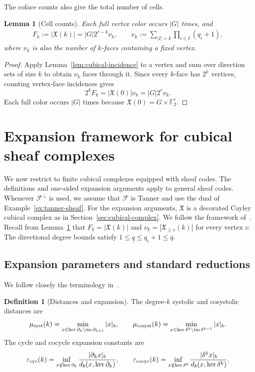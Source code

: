 \documentclass[11pt,letterpaper]{article}
\renewcommand{\le}{\leqslant}
\renewcommand{\ge}{\geqslant}
\newtheorem{lemma}[theorem]{Lemma}
\theoremstyle{definition}
\newtheorem{definition}[theorem]{Definition}
\theoremstyle{remark}
\newcommand{\F}{\mathbb F}
\newcommand{\cF}{\mathcal F}
\newcommand{\X}{\mathfrak{X}}
\newcommand{\im}{\operatorname{im}}
\newcommand{\db}{d_b}
\newcommand{\eps}{\varepsilon}
\newcommand{\minus}{\setminus}
\begin{document}
The coface counts also give the total number of cells.
\begin{lemma}[Cell counts]\label{lem:cell-counts}
Each full vertex color occurs $|G|$ times, and
\begin{align*}
 F_k:=|\X(k)|=|G|2^{r-k}\nu_k,\qquad
 \nu_k:=\sum_{|I|=k}\prod_{i\in I}(q_i+1),
\end{align*}
where $\nu_k$ is also the number of $k$-faces containing a fixed vertex.
\end{lemma}
\begin{proof}
Apply Lemma~\ref{lem:cubical-incidence} to a vertex and sum
over direction sets of size $k$ to obtain $\nu_k$ faces through it.
Since every $k$-face has $2^k$ vertices, counting vertex-face
incidences gives
\[
 2^k F_k=|\X(0)|\nu_k=|G|2^r\nu_k.
\]
Each full color occurs $|G|$ times because
$\X(0)=G\times\F_2^r$.
\end{proof}

\section{Expansion framework for cubical sheaf complexes}
\label{sec:complex-expansion}\label{sec:local-to-global}
We now restrict to finite cubical complexes equipped with sheaf
codes. The definitions and one-sided expansion arguments apply to
general sheaf codes. Whenever $\cF^\perp$ is used, we assume that
$\cF$ is Tanner and use the dual of Example~\ref{ex:tanner-sheaf}.
For the expansion arguments, $\X$ is a decorated Cayley
cubical complex as in Section~\ref{sec:cubical-complex}. We follow
the framework of~\cite{DinurLinVidick2024}.
Recall from Lemma~\ref{lem:cell-counts} that $F_k=|\X(k)|$ and
$\nu_k=|\X_{\ge v}(k)|$ for every vertex $v$.
The directional degree bounds satisfy $1\le\underline q\le q_i+1\le\overline q$.

\subsection{Expansion parameters and standard reductions}
\label{sec:expansion-parameters}\label{sec:cominimal-expansion}
We follow closely the terminology in~\cite[Definition~2.1]{DinurLinVidick2024}.

\begin{definition}[Distances and expansion]
\label{def:systolic-distances}\label{def:cycle-expansion}
The degree-$k$ systolic and cosystolic distances are
\[
 \mu_{\rm syst}(k)=\min_{x\in\ker\partial_k\minus\im\partial_{k+1}}|x|_b,
 \qquad
 \mu_{\rm cosyst}(k)=\min_{x\in\ker\delta^k\minus\im\delta^{k-1}}|x|_b.
\]
The cycle and cocycle expansion constants are
\[
 \eps_{\rm cyc}(k)=\inf_{x\notin\ker\partial_k}
     \frac{|\partial_kx|_b}{\db(x,\ker\partial_k)},\qquad
 \eps_{\rm cocyc}(k)=\inf_{x\notin\ker\delta^k}
     \frac{|\delta^kx|_b}{\db(x,\ker\delta^k)}.
\]
\end{definition}
\end{document}
